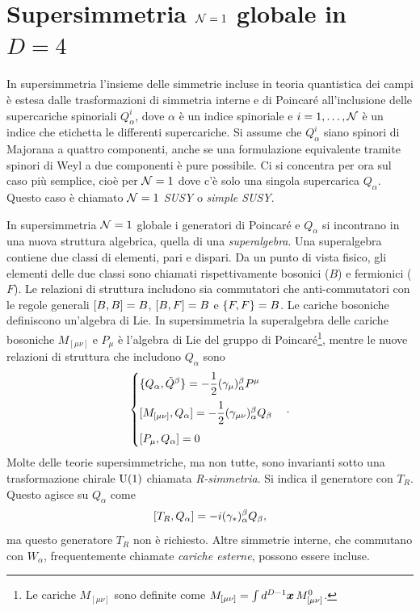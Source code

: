 \chapter{Supersimmetria \texorpdfstring{$\mathcal{N} = 1$}{N = 1} globale in \texorpdfstring{$D = 4$}{D = 4}}
In supersimmetria l'insieme delle simmetrie incluse in teoria quantistica dei campi è estesa dalle trasformazioni di simmetria interne e di Poincaré all'inclusione delle supercariche spinoriali $Q_\alpha^i$, dove $\alpha$ è un indice spinoriale e $i = 1,\dots,\mathcal{N}$ è un indice che etichetta le differenti supercariche. Si assume che $Q_\alpha^i$ siano spinori di Majorana a quattro componenti, anche se una formulazione equivalente tramite spinori di Weyl a due componenti è pure possibile. Ci si concentra per ora sul caso più semplice, cioè per $\mathcal{N} = 1$ dove c'è solo una singola supercarica $Q_\alpha$. Questo caso è chiamato \emph{$\mathcal{N} = 1$ SUSY} o \emph{simple SUSY}.

In supersimmetria $\mathcal{N} = 1$ globale i generatori di Poincaré e $Q_\alpha$ si incontrano in una nuova struttura algebrica, quella di una \emph{superalgebra}. Una superalgebra contiene due classi di elementi, pari e dispari. Da un punto di vista fisico, gli elementi delle due classi sono chiamati rispettivamente bosonici ($B$) e fermionici ($F$). Le relazioni di struttura includono sia commutatori che anti-commutatori con le regole generali $[B,B] = B$, $[B,F] = B$ e $\{F,F\} = B$. Le cariche bosoniche definiscono un'algebra di Lie. In supersimmetria la superalgebra delle cariche bosoniche $M_{[\mu\nu]}$ e $P_\mu$ è l'algebra di Lie del gruppo di Poincaré\footnote{Le cariche $M_{[\mu\nu]}$ sono definite come $M_{[\mu\nu]} = \int d^{D - 1}\bm{x}\,M^0_{[\mu\nu]}$.}, mentre le nuove relazioni di struttura che includono $Q_\alpha$ sono 
\begin{equation}
\label{eq: superalgebra per N = 1}
    \begin{cases}
        \{Q_\alpha,\tilde{Q}^\beta\} = -\dfrac{1}{2}(\gamma_\mu)_\alpha^\beta P^\mu \\[2ex] 
        [M_{[\mu\nu]},Q_\alpha] = -\dfrac{1}{2}(\gamma_{\mu\nu})_\alpha^\beta Q_\beta \\[2ex]
        [P_\mu,Q_\alpha] = 0
    \end{cases}.
\end{equation}
Molte delle teorie supersimmetriche, ma non tutte, sono invarianti sotto una trasformazione chirale $\mathrm{U}(1)$ chiamata \emph{R-simmetria}. Si indica il generatore con $T_R$. Questo agisce su $Q_\alpha$ come 
\begin{equation}
    [T_R,Q_\alpha] = -i(\gamma_*)^\beta_\alpha Q_\beta,
\end{equation}
ma questo generatore $T_R$ non è richiesto. Altre simmetrie interne, che commutano con $W_\alpha$, frequentemente chiamate \emph{cariche esterne}, possono essere incluse.

